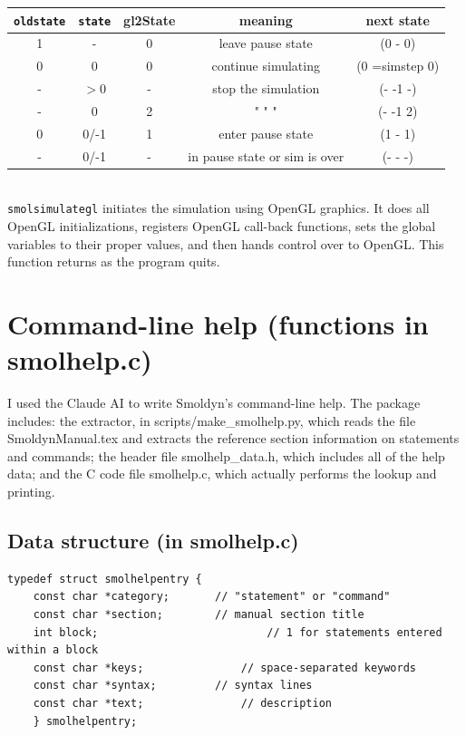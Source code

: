 \documentclass {scrbook}
\newcommand {\ttt} {\texttt}
\begin{document}
\begin{description}
\begin{longtable}[c]{ccccc}
\ttt{oldstate} & \ttt{state} & gl2State & meaning & next state\\
\hline
1 & - & 0 & leave pause state & (0 - 0)\\
0 & 0 & 0 & continue simulating & (0 =simstep 0)\\
- & $>$0 & - & stop the simulation & (- -1 -)\\
- & 0 & 2 &  "    "     " & (- -1 2)\\
0 & 0/-1 & 1 & enter pause state & (1 - 1)\\
- & 0/-1 & - & in pause state or sim is over & (- - -)\\

\end{longtable}

\item[\ttt{void smolsimulategl(simptr sim)}]
\hfill \\
\ttt{smolsimulategl} initiates the simulation using OpenGL graphics. It does all OpenGL initializations, registers OpenGL call-back functions, sets the global variables to their proper values, and then hands control over to OpenGL. This function returns as the program quits.


\end{description}

\section{Command-line help (functions in smolhelp.c)}

I used the Claude AI to write Smoldyn's command-line help. The package includes: the extractor, in scripts/make\_smolhelp.py, which reads the file SmoldynManual.tex and extracts the reference section information on statements and commands; the header file smolhelp\_data.h, which includes all of the help data; and the C code file smolhelp.c, which actually performs the lookup and printing.

\subsection{Data structure (in smolhelp.c)}

\begin{lstlisting}
typedef struct smolhelpentry {
	const char *category;		// "statement" or "command"
	const char *section;		// manual section title
	int block;							// 1 for statements entered within a block
	const char *keys;				// space-separated keywords
	const char *syntax;			// syntax lines
	const char *text;				// description
	} smolhelpentry;
\end{lstlisting}
\end{document}
